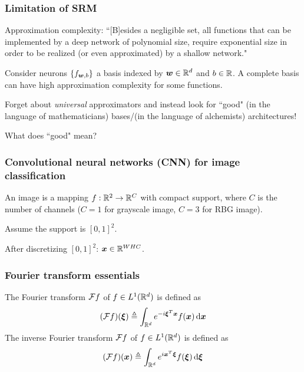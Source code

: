 \documentclass{beamer}
\begin{document}
\begin{frame}

\frametitle{Limitation of SRM}

Approximation complexity:
``[B]esides a negligible set, all functions that can be implemented by a deep network of polynomial size, require exponential size in order to be realized (or even approximated) by a shallow network."\cite{cohen2016expressive}

Consider neurons $\{f_{{\bm w}, b}\}$ a basis indexed by ${\bm w} \in {\mathbb R}^d$ and $b \in {\mathbb R}$.
A complete basis can have high approximation complexity for some functions.

Forget about \emph{universal} approximators and instead look for ``good" (in the language of mathematicians) bases/(in the language of alchemists) architectures!

What does ``good" mean?

\end{frame}

\begin{frame}

\frametitle{Convolutional neural networks (CNN) for image classification}

An image is a mapping $f: {\mathbb R}^2 \rightarrow {\mathbb R}^C$ with compact support, where $C$ is the number of channels ($C = 1$ for grayscale image, $C = 3$ for RBG image).

Assume the support is $[0, 1]^2$.

After discretizing $[0, 1]^2$: ${\bm x} \in {\mathbb R}^{W H C}$.

\end{frame}

\begin{frame}

\frametitle{Fourier transform essentials}

\begin{definition}
The Fourier transform ${\mathcal F} f$ of $f \in L^1 ({\mathbb R}^d)$ is defined as
\[
(\calf f) (\bmxi) \triangleq \int_{\bbr^d} e^{-i \bmxi^T \bmx} f(\bmx) \dif \bmx
\]
The inverse Fourier transform ${\mathcal F} f$ of $f \in L^1 ({\mathbb R}^d)$ is defined as
\[
(\calf f) (\bmx) \triangleq \int_{\bbr^d} e^{i \bmx^T \bmxi} f(\bmxi) \dif \bmxi
\]
\end{definition}

\end{frame}
\end{document}
